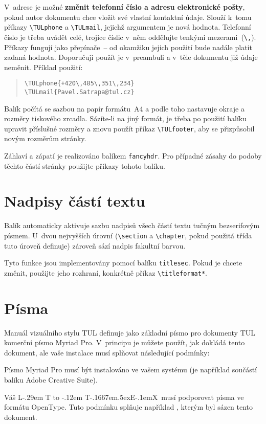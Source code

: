 \documentclass[a4paper,12pt,twoside]{article}
\makeatletter
\newcommand{\cmdfont}[1]{\texttt{\color{\tulcolor}#1}}
\newcommand{\cmd}[1]{\cmdfont{\textbackslash #1}}
\newenvironment{itemize*}%
  {\begin{itemize}%
    \setlength{\parskip}{0.25\baselineskip}%
    \setlength{\itemsep}{0pt}%
    \setlength{\partopsep}{0pt}%
    \setlength{\topsep}{0pt}}%
  {\end{itemize}}
\def\TeX{T\kern-.1667em\lower.5ex\hbox{E}\kern-.1emX\@}
\DeclareRobustCommand{\LaTeX}{L\kern-.29em%
        {\sbox\z@ T%
         \vbox to\ht\z@{\hbox{\check@mathfonts
                              \fontsize\sf@size\z@
                              \math@fontsfalse\selectfont
                              A}%
                        \vss}%
        }%
        \kern-.12em%
        \TeX}
\DeclareRobustCommand\XeLaTeX{%
  \leavevmode
  \smash{%
    X\lower.5ex
    \hbox{\kern-.1em
      \setbox0=\hbox{E}\dimen0=\ht0\advance\dimen0by\dp0\relax
      \reflectbox{E}%
    }\kern-0.075em\LaTeX}}
\makeatother
\begin{document}
V~adrese je možné \textbf{změnit telefonní číslo a adresu elektronické pošty},
pokud autor dokumentu chce vložit své vlastní kontaktní údaje. Slouží k~tomu
příkazy \cmd{TULphone} a \cmd{TULmail}, jejichž argumentem je nová hodnota.
Telefonní číslo je třeba uvádět celé, trojice číslic v~něm oddělujte tenkými
mezerami~(\cmd{,}). Příkazy fungují jako přepínače~-- od okamžiku jejich
použití bude nadále platit zadaná hodnota. Doporučuji použít je v~preambuli a
v~těle dokumentu již údaje neměnit. Příklad použití:

\begin{quote}
\cmd{TULphone\{+420\textbackslash ,485\textbackslash ,351\textbackslash ,234\}}\\
\cmd{TULmail\{Pavel.Satrapa@tul.cz\}}
\end{quote}

Balík počítá se sazbou na papír formátu~A4 a podle toho nastavuje okraje a
rozměry tiskového zrcadla. Sázíte-li na jiný formát, je třeba po použití balíku
upravit příslušné rozměry a znovu použít příkaz \cmd{TULfooter}, aby se
přizpůsobil novým rozměrům stránky.

Záhlaví a zápatí je realizováno balíkem \cmdfont{fancyhdr}. Pro případné zásahy
do podoby těchto částí stránky použijte příkazy tohoto balíku.


\section{Nadpisy částí textu}

Balík automaticky aktivuje sazbu nadpisů všech částí textu tučným bezserifovým
písmem. U~dvou nejvyšších úrovní (\cmd{section} a \cmd{chapter}, pokud použitá
třída tuto úroveň definuje) zároveň sází nadpis fakultní barvou.

Tyto funkce jsou implementovány pomocí balíku \cmdfont{titlesec}. Pokud je
chcete změnit, použijte jeho rozhraní, konkrétně příkaz \cmd{titleformat*}.


\section{Písma}\label{pisma}

Manuál vizuálního stylu TUL definuje jako základní písmo pro dokumenty TUL
komerční písmo Myriad Pro. V~principu je můžete použít, jak dokládá tento
dokument, ale vaše instalace musí splňovat následující podmínky:

\begin{itemize*}
\item Písmo Myriad Pro musí být instalováno ve vašem systému (je například
součástí balíku Adobe Creative Suite).

\item Váš \LaTeX\ musí podporovat písma ve formátu OpenType. Tuto podmínku
splňuje například \XeLaTeX, kterým byl sázen tento dokument.
\end{itemize*}
\end{document}
